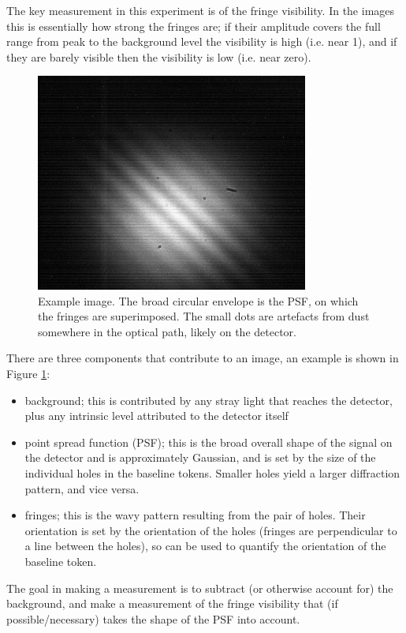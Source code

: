 \documentclass[11pt]{article}
\begin{document}
The key measurement in this experiment is of the fringe visibility. In the images this is essentially how strong the fringes are; if their amplitude covers the full range from peak to the background level the visibility is high (i.e. near 1), and if they are barely visible then the visibility is low (i.e. near zero).

\begin{figure}[h]
    \centering
    \includegraphics[width=0.8\textwidth]{doc/det-img.png}
    \caption{Example image. The broad circular envelope is the PSF, on which the fringes are superimposed. The small dots are artefacts from dust somewhere in the optical path, likely on the detector.}
    \label{fig:det-img}
\end{figure}

There are three components that contribute to an image, an example is shown in Figure \ref{fig:det-img}:
\begin{itemize}
    \item background; this is contributed by any stray light that reaches the detector, plus any intrinsic level attributed to the detector itself
    \item point spread function (PSF); this is the broad overall shape of the signal on the detector and is approximately Gaussian, and is set by the size of the individual holes in the baseline tokens. Smaller holes yield a larger diffraction pattern, and vice versa.
    \item fringes; this is the wavy pattern resulting from the pair of holes. Their orientation is set by the orientation of the holes (fringes are perpendicular to a line between the holes), so can be used to quantify the orientation of the baseline token.
\end{itemize}
The goal in making a measurement is to subtract (or otherwise account for) the background, and make a measurement of the fringe visibility that (if possible/necessary) takes the shape of the PSF into account.
\end{document}
